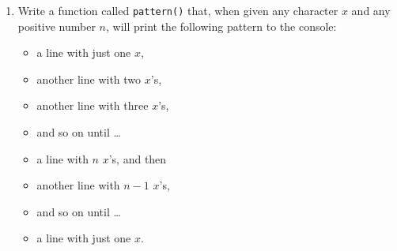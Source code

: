 \documentclass[]{book}
\makeatletter
\newenvironment{Shaded}{\begin{snugshade}}{\end{snugshade}}
\newcommand{\KeywordTok}[1]{\textcolor[rgb]{0.13,0.29,0.53}{\textbf{#1}}}
\newcommand{\DecValTok}[1]{\textcolor[rgb]{0.00,0.00,0.81}{#1}}
\newcommand{\FloatTok}[1]{\textcolor[rgb]{0.00,0.00,0.81}{#1}}
\newcommand{\StringTok}[1]{\textcolor[rgb]{0.31,0.60,0.02}{#1}}
\newcommand{\OperatorTok}[1]{\textcolor[rgb]{0.81,0.36,0.00}{\textbf{#1}}}
\newcommand{\NormalTok}[1]{#1}
\providecommand{\tightlist}{%
  \setlength{\itemsep}{0pt}\setlength{\parskip}{0pt}}
\newenvironment{kframe}{%
\medskip{}
\setlength{\fboxsep}{.8em}
 \def\at@end@of@kframe{}%
 \ifinner\ifhmode%
  \def\at@end@of@kframe{\end{minipage}}%
  \begin{minipage}{\columnwidth}%
 \fi\fi%
 \def\FrameCommand##1{\hskip\@totalleftmargin \hskip-\fboxsep
 \colorbox{shadecolor}{##1}\hskip-\fboxsep
     \hskip-\linewidth \hskip-\@totalleftmargin \hskip\columnwidth}%
 \MakeFramed {\advance\hsize-\width
   \@totalleftmargin\z@ \linewidth\hsize
   \@setminipage}}%
 {\par\unskip\endMakeFramed%
 \at@end@of@kframe}
\renewenvironment{Shaded}{\begin{kframe}}{\end{kframe}}
\theoremstyle{definition}
\theoremstyle{definition}
\theoremstyle{definition}
\theoremstyle{remark}
\makeatother
\begin{document}
{\begin{enumerate}
  The absolute value is important enough that R provides the
  \texttt{abs()} function to
  compute it. Thus:

\begin{Shaded}
\begin{Highlighting}[]
\KeywordTok{abs}\NormalTok{(}\OperatorTok{-}\FloatTok{3.7}\NormalTok{)}
\end{Highlighting}
\end{Shaded}

\begin{verbatim}
## [1] 3.7
\end{verbatim}

  Write a function called \texttt{absolute()} that computes the absolute
  value of any given number \texttt{x}. Your code should make no
  reference to R's \texttt{abs()}.

  \textbf{Small Bonus}: Write the function so that it follows the
  vector-in, vector-out principle, that is: when it is given a vector of
  numbers it returns the vector of their absolute values, like this:

\begin{Shaded}
\begin{Highlighting}[]
\NormalTok{vec <-}\StringTok{ }\KeywordTok{c}\NormalTok{(}\OperatorTok{-}\DecValTok{3}\NormalTok{, }\DecValTok{5}\NormalTok{, }\OperatorTok{-}\FloatTok{2.7}\NormalTok{)}
\KeywordTok{absolute}\NormalTok{(vec)}
\end{Highlighting}
\end{Shaded}

\begin{verbatim}
## [1] 3.0 5.0 2.7
\end{verbatim}
\item
  Write a function called \texttt{pattern()} that, when given any
  character \(x\) and any positive number \(n\), will print the
  following pattern to the console:

  \begin{itemize}
  \tightlist
  \item
    a line with just one \(x\),
  \item
    another line with two \(x\)'s,
  \item
    another line with three \(x\)'s,
  \item
    and so on until \ldots{}
  \item
    a line with \(n\) \(x\)'s, and then
  \item
    another line with \(n-1\) \(x\)'s,
  \item
    and so on until \ldots{}
  \item
    a line with just one \(x\).
  \end{itemize}


\end{enumerate}}
\end{document}
